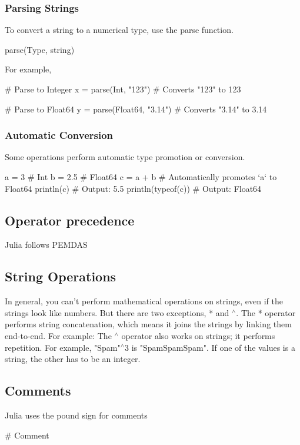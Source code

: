 \documentclass{report}
\begin{document}
    \bigbreak \noindent 
    \subsubsection{Parsing Strings}
    \bigbreak \noindent 
    To convert a string to a numerical type, use the parse function.
    \bigbreak \noindent 
    \begin{jlcode}
    parse(Type, string)
    \end{jlcode}
    \bigbreak \noindent 
    For example,
    \bigbreak \noindent 
    \begin{jlcode}
        # Parse to Integer
        x = parse(Int, "123")        # Converts "123" to 123

        # Parse to Float64
        y = parse(Float64, "3.14")   # Converts "3.14" to 3.14
    \end{jlcode}
    \bigbreak \noindent 
    \subsubsection{Automatic Conversion}
    \bigbreak \noindent 
    Some operations perform automatic type promotion or conversion.
    \bigbreak \noindent 
    \begin{jlcode}
        a = 3          # Int
        b = 2.5        # Float64
        c = a + b      # Automatically promotes `a` to Float64
        println(c)     # Output: 5.5
        println(typeof(c))  # Output: Float64
    \end{jlcode}

    \bigbreak \noindent 
    \subsection{Operator precedence}
    \bigbreak \noindent 
    Julia follows PEMDAS
    \bigbreak \noindent 
    \subsection{String Operations}
    \bigbreak \noindent 
    In general, you can’t perform mathematical operations on strings, even if the strings look like numbers. But there are two exceptions, * and $^{\land}$.
    \bigbreak \noindent 
    The * operator performs string concatenation, which means it joins the strings by linking them end-to-end. For example:
    \bigbreak \noindent 
    The $^{\land} $ operator also works on strings; it performs repetition. For example, "Spam"$^{\land}3$ is "SpamSpamSpam". If one of the values is a string, the other has to be an integer.
    \bigbreak \noindent 
    \subsection{Comments}
    \bigbreak \noindent 
    Julia uses the pound sign for comments
    \bigbreak \noindent 
    \begin{jlcode}
    # Comment
    \end{jlcode}

    \pagebreak 
    \bigbreak \noindent 























    
\end{document}
